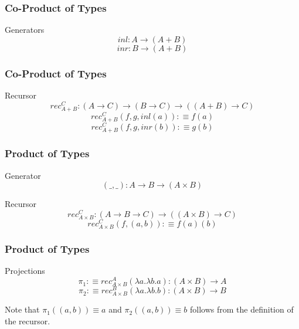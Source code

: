 \documentclass[14pt,compress]{beamer}
\begin{document}
\begin{frame}\label{frame : gen of co-product}
\frametitle{Co-Product of Types}

\begin{block}{Generators}
\textcolor{beamer@mathtext}{
\[ inl : A \to (A + B) \]
\[ inr : B \to (A + B) \]}
\end{block}
\end{frame}

\begin{frame}\label{frame : rec of co-product}
\frametitle{Co-Product of Types}

\begin{block}{Recursor}
\textcolor{beamer@mathtext}{
\[ rec_{A+B}^C : (A \to C) \to (B \to C) \to ((A + B) \to C) \]
\[ rec_{A+B}^C(f,g,inl(a)) :\equiv f(a) \]
\[ rec_{A+B}^C(f,g,inr(b)) :\equiv g(b) \]}
\end{block}
\end{frame}

\begin{frame}\label{frame : product type}
\frametitle{Product of Types}

\begin{block}{Generator}
\textcolor{beamer@mathtext}{
\[ (\_,\_) : A \to B \to (A \times B) \]}
\end{block}
\pause
\begin{block}{Recursor}
\textcolor{beamer@mathtext}{
\[ rec_{A \times B}^C : (A \to B \to C) \to ((A \times B) \to C) \]
\[ rec_{A \times B}^C(f,(a,b)) :\equiv f(a)(b) \]}
\end{block}
\end{frame}

\begin{frame}\label{frame : projections}
\frametitle{Product of Types}

\begin{block}{Projections}
\textcolor{beamer@mathtext}{
\[ \pi_1 :\equiv rec_{A \times B}^A (\lambda a. \lambda b. a) : (A \times B) \to A\]
\[ \pi_2 :\equiv rec_{A \times B}^B (\lambda a. \lambda b. b) : (A \times B) \to B\]}
\end{block}

\pause
\begin{block}{}
Note that \textcolor{beamer@mathtext}{$\pi_1((a,b)) \equiv a$} and
\textcolor{beamer@mathtext}{$\pi_2((a,b)) \equiv b$}
follows from the definition of the recursor.
\end{block}

\end{frame}
\end{document}
